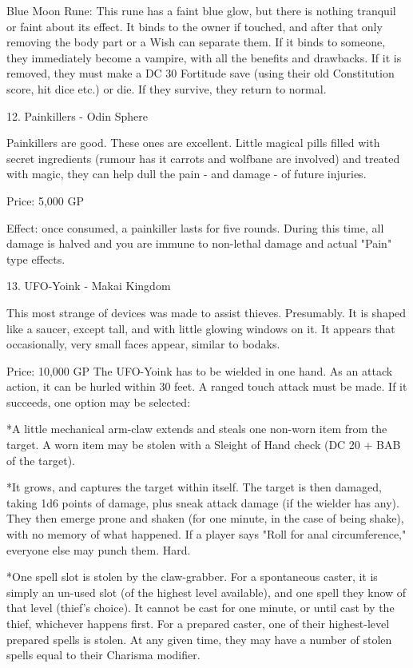 \begin{multicols}{2}
Blue Moon Rune: This rune has a faint blue glow, but there is nothing tranquil or faint about its effect. It binds to the owner if touched, and after that only removing the body part or a Wish can separate them. If it binds to someone, they immediately become a vampire, with all the benefits and drawbacks. If it is removed, they must make a DC 30 Fortitude save (using their old Constitution score, hit dice etc.) or die. If they survive, they return to normal.


12. Painkillers - Odin Sphere

Painkillers are good. These ones are excellent. Little magical pills filled with secret ingredients (rumour has it carrots and wolfbane are involved) and treated with magic, they can help dull the pain - and damage - of future injuries.

Price: 5,000 GP

Effect: once consumed, a painkiller lasts for five rounds. During this time, all damage is halved and you are immune to non-lethal damage and actual "Pain" type effects.


13. UFO-Yoink - Makai Kingdom

This most strange of devices was made to assist thieves. Presumably. It is shaped like a saucer, except tall, and with little glowing windows on it. It appears that occasionally, very small faces appear, similar to bodaks.

Price: 10,000 GP
The UFO-Yoink has to be wielded in one hand. As an attack action, it can be hurled within 30 feet. A ranged touch attack must be made. If it succeeds, one option may be selected:

*A little mechanical arm-claw extends and steals one non-worn item from the target. A worn item may be stolen with a Sleight of Hand check (DC 20 + BAB of the target).

*It grows, and captures the target within itself. The target is then damaged, taking 1d6 points of damage, plus sneak attack damage (if the wielder has any). They then emerge prone and shaken (for one minute, in the case of being shake), with no memory of what happened. If a player says "Roll for anal circumference," everyone else may punch them. Hard.

*One spell slot is stolen by the claw-grabber. For a spontaneous caster, it is simply an un-used slot (of the highest level available), and one spell they know of that level (thief's choice). It cannot be cast for one minute, or until cast by the thief, whichever happens first. For a prepared caster, one of their highest-level prepared spells is stolen. At any given time, they may have a number of stolen spells equal to their Charisma modifier. 



\end{multicols}
